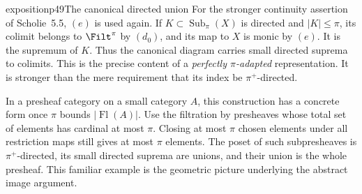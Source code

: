 \begin{dcomment}{exposition}{p49}{The canonical directed union}
For the stronger continuity assertion of Scholie~5.5, $(e)$ is used again. If $K\subset\operatorname{Sub}_{\pi}(X)$ is directed and $|K|\leq\pi$, its colimit belongs to $\Filt^\pi$ by $(d_0)$, and its map to $X$ is monic by $(e)$. It is the supremum of $K$. Thus the canonical diagram carries small directed suprema to colimits. This is the precise content of a \emph{perfectly $\pi$-adapted} representation. It is stronger than the mere requirement that its index be $\pi^+$-directed.

In a presheaf category on a small category $A$, this construction has a concrete form once $\pi$ bounds $|\operatorname{Fl}(A)|$. Use the filtration by presheaves whose total set of elements has cardinal at most $\pi$. Closing at most $\pi$ chosen elements under all restriction maps still gives at most $\pi$ elements. The poset of such subpresheaves is $\pi^+$-directed, its small directed suprema are unions, and their union is the whole presheaf. This familiar example is the geometric picture underlying the abstract image argument.
\end{dcomment}


